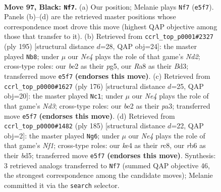 \documentclass[11pt]{article}
\begin{document}
\clearpage

\begin{figure}[p]\centering
\begin{subfigure}{0.46\textwidth}\centering
\resizebox{\linewidth}{!}{%
\newchessgame
\chessboard[
  setfen={r7/3k4/PR6/4n1P1/4K3/7P/2P1B3/8 b - - 2 97},
  showmover=false,
  pgfstyle=straightmove, color=movearrow, markmove={e5-f7}
]}
\caption{}
\end{subfigure}\hfill
\begin{subfigure}{0.46\textwidth}\centering
\resizebox{\linewidth}{!}{%
\newchessgame
\chessboard[
  setfen={8/3n3p/4K3/P1k3P1/8/3b1B2/3B4/8 b - - 36 98},
  showmover=false,
  pgfstyle=straightmove, color=movearrow, markmove={d7-b8}
]}
\caption{}
\end{subfigure}
\\[4pt]
\begin{subfigure}{0.46\textwidth}\centering
\resizebox{\linewidth}{!}{%
\newchessgame
\chessboard[
  setfen={8/8/8/5r1p/2k5/p2N2K1/8/7R w - - 2 89},
  showmover=false,
  pgfstyle=straightmove, color=movearrow, markmove={d3-c1}
]}
\caption{}
\end{subfigure}\hfill
\begin{subfigure}{0.46\textwidth}\centering
\resizebox{\linewidth}{!}{%
\newchessgame
\chessboard[
  setfen={2R2n2/4kP2/8/2PB4/8/2P5/2K2P2/8 b - - 2 93},
  showmover=false,
  pgfstyle=straightmove, color=movearrow, markmove={f8-g6}
]}
\caption{}
\end{subfigure}
\caption{\textbf{Move 97, Black: \texttt{Nf7}.} (a) Our position; Melanie plays \texttt{Nf7} (\texttt{e5f7}). Panels (b)--(d) are the retrieved master positions whose correspondence most drove this move (highest QAP objective among those that transfer to it). (b) Retrieved from \texttt{ccrl\_top\_p0001\#2327} (ply 195) [structural distance $d$=28, QAP obj=24]: the master played \texttt{Nb8}; under $\mu$ our \emph{Ne4} plays the role of that game's \emph{Nd2}; cross-type roles: our \emph{b}e2 as their \emph{p}g5, our \emph{R}a8 as their \emph{B}d3; transferred move \texttt{e5f7} \textbf{(endorses this move)}. (c) Retrieved from \texttt{ccrl\_top\_p0000\#1627} (ply 176) [structural distance $d$=25, QAP obj=20]: the master played \texttt{Nc1}; under $\mu$ our \emph{Ne4} plays the role of that game's \emph{Nd3}; cross-type roles: our \emph{b}e2 as their \emph{p}a3; transferred move \texttt{e5f7} \textbf{(endorses this move)}. (d) Retrieved from \texttt{ccrl\_top\_p0000\#1482} (ply 185) [structural distance $d$=22, QAP obj=2]: the master played \texttt{Ng6}; under $\mu$ our \emph{Ne4} plays the role of that game's \emph{Nf1}; cross-type roles: our \emph{k}e4 as their \emph{r}c8, our \emph{r}b6 as their \emph{b}d5; transferred move \texttt{e5f7} \textbf{(endorses this move)}. Synthesis: 3 retrieved analogs transferred to \texttt{Nf7} (summed QAP objective 46, the strongest correspondence among the candidate moves); Melanie committed it via the \texttt{search} selector.}
\label{fig:thought-m193}
\end{figure}
\end{document}
